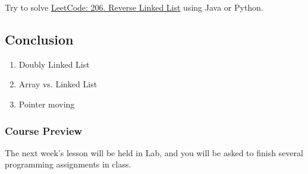 \documentclass[aspectratio=169, 14pt]{beamer}
\begin{document}
\begin{frame}

    {\large {}} Try to solve \href{https://leetcode.com/problems/reverse-linked-list/}{LeetCode: 206. Reverse Linked List} using Java or Python.

\end{frame}

\begin{frame}

    \section{\textcolor{darkmidnightblue}{Conclusion}} 
    \begin{enumerate}
        \item Doubly Linked List
        \item Array vs. Linked List
        \item Pointer moving
    \end{enumerate}
\end{frame}

\begin{frame}
    \frametitle{Course Preview}
{\large {}} The next week's lesson will be held in Lab, and you will be asked to finish several programming assignments in class.

\end{frame}
\end{document}
